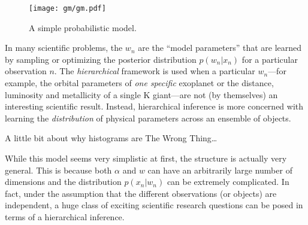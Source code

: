 \documentclass[12pt,preprint]{aastex}
\newcommand{\figlabel}[1]{\label{fig:#1}}
\newcommand{\pr}[1]{p ( #1 )}
\begin{document}
\begin{figure}[htbp]
    \begin{center}
        \texttt{[image: gm/gm.pdf]}
    \end{center}
    \caption{A simple probabilistic model.\figlabel{gm-simple}}
\end{figure}

In many scientific problems, the $w_n$ are the ``model parameters'' that are
learned by sampling or optimizing the posterior distribution $\pr{w_n | x_n}$
for a particular observation $n$. The \emph{hierarchical} framework
is used when a particular $w_n$---for example, the orbital parameters of
\emph{one specific} exoplanet or the distance, luminosity and metallicity of
a single K giant---are not (by themselves) an interesting scientific result.
Instead, hierarchical inference is more concerned with learning the
\emph{distribution} of physical parameters across an ensemble of objects.

A little bit about why histograms are The Wrong Thing\ldots

While this model seems very simplistic at first, the structure is actually
very general. This is because both $\alpha$ and $w$ can have an arbitrarily
large number of dimensions and the distribution $\pr{x_n | w_n}$ can be
extremely complicated. In fact, under the assumption that the different
observations (or objects) are independent, a huge class of exciting
scientific research questions can be posed in terms of a hierarchical
inference.




\end{document}
